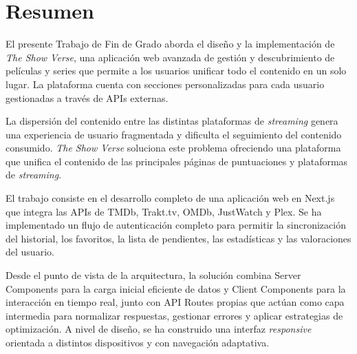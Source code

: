 \documentclass[oneside,a4paper,12pt]{book}
\renewcommand{\tablename}{Tabla}
\begin{document}
\renewcommand{\tablename}{Tabla} 


\baselineskip

\frontmatter




\mainmatter



\newpage{\pagestyle{empty}}
\setcounter{page}{1}
\tableofcontents


\listoffigures

\listoftables


\newpage{\pagestyle{empty}}
\chapter*{Resumen}

El presente Trabajo de Fin de Grado aborda el diseño y la implementación de \textit{The Show Verse}, una aplicación web avanzada de gestión y descubrimiento de películas y series que permite a los usuarios unificar todo el contenido en un solo lugar. La plataforma cuenta con secciones personalizadas para cada usuario gestionadas a través de APIs externas.

La dispersión del contenido entre las distintas plataformas de \textit{streaming} genera una experiencia de usuario fragmentada y dificulta el seguimiento del contenido consumido. \textit{The Show Verse} soluciona este problema ofreciendo una plataforma que unifica el contenido de las principales páginas de puntuaciones y plataformas de \textit{streaming}.

El trabajo consiste en el desarrollo completo de una aplicación web en Next.js que integra las APIs de TMDb, Trakt.tv, OMDb, JustWatch y Plex. Se ha implementado un flujo de autenticación completo para permitir la sincronización del historial, los favoritos, la lista de pendientes, las estadísticas y las valoraciones del usuario.

Desde el punto de vista de la arquitectura, la solución combina Server Components para la carga inicial eficiente de datos y Client Components para la interacción en tiempo real, junto con API Routes propias que actúan como capa intermedia para normalizar respuestas, gestionar errores y aplicar estrategias de optimización. A nivel de diseño, se ha construido una interfaz \textit{responsive} orientada a distintos dispositivos y con navegación adaptativa.
\end{document}
